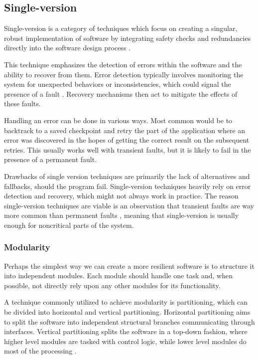 
\subsection{Single-version} \label{single}

Single-version is a category of techniques which focus on creating a singular, robust implementation of software by integrating safety checks and redundancies directly into the software design process \cite{nasa:sft}.

This technique emphasizes the detection of errors within the software and the ability to recover from them. Error detection typically involves monitoring the system for unexpected behaviors or inconsistencies, which could signal the presence of a fault \cite{shubu}. Recovery mechanisms then act to mitigate the effects of these faults.

Handling an error can be done in various ways. Most common would be to backtrack to a saved checkpoint and retry the part of the application where an error was discovered in the hopes of getting the correct result on the subsequent retries. This usually works well with transient faults, but it is likely to fail in the presence of a permanent fault.

Drawbacks of single version techniques are primarily the lack of alternatives and fallbacks, should the program fail. Single-version techniques heavily rely on error detection and recovery, which might not always work in practice. The reason single-version techniques are viable is an observation that transient faults are way more common than permanent faults \cite{1676899}, meaning that single-version is usually enough for noncritical parts of the system.

\subsubsection{Modularity}

Perhaps the simplest way we can create a more resilient software is to structure it into independent modules. Each module should handle one task and, when possible, not directly rely upon any other modules for its functionality.

A technique commonly utilized to achieve modularity is partitioning, which can be divided into horizontal and vertical partitioning. Horizontal partitioning aims to split the software into independent structural branches communicating through interfaces. 
Vertical partitioning splits the software in a top-down fashion, where higher level modules are tasked with control logic, while lower level modules do most of the processing \cite{nasa:sft}.


